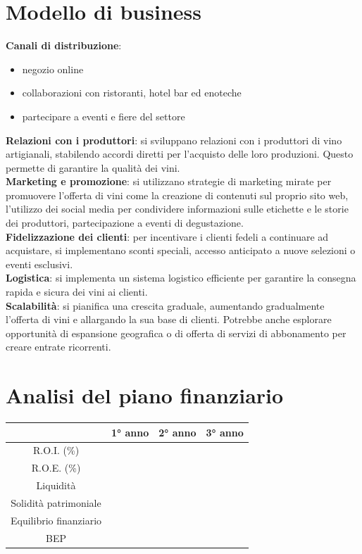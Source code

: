 \documentclass[12pt, a4paper]{article}
\newcommand{\meskip}{\medskip \\}
\begin{document}
\section*{Modello di business}
\textbf{Canali di distribuzione}:
\begin{itemize}[itemsep=-5pt, topsep=0pt]
    \item negozio online
    \item collaborazioni con ristoranti, hotel bar ed enoteche
    \item partecipare a eventi e fiere del settore
\end{itemize}\medskip
\textbf{Relazioni con i produttori}: si sviluppano relazioni con i produttori di vino artigianali, stabilendo accordi diretti per l'acquisto delle loro produzioni. Questo permette di garantire la qualità dei vini.\meskip
\textbf{Marketing e promozione}: si utilizzano strategie di marketing mirate per promuovere l'offerta di vini come la creazione di contenuti sul proprio sito web, l'utilizzo dei social media per condividere informazioni sulle etichette e le storie dei produttori, partecipazione a eventi di degustazione.\meskip
\textbf{Fidelizzazione dei clienti}: per incentivare i clienti fedeli a continuare ad acquistare, si implementano sconti speciali, accesso anticipato a nuove selezioni o eventi esclusivi.\meskip
\textbf{Logistica}: si implementa un sistema logistico efficiente per garantire la consegna rapida e sicura dei vini ai clienti.\meskip
\textbf{Scalabilità}: si pianifica una crescita graduale, aumentando gradualmente l'offerta di vini e allargando la sua base di clienti. Potrebbe anche esplorare opportunità di espansione geografica o di offerta di servizi di abbonamento per creare entrate ricorrenti.
\newpage
\section*{Analisi del piano finanziario}
\begin{tabular}{|c|c|c|c|}
    \hline
                           & 1° anno & 2° anno & 3° anno \\ \hline
    R.O.I. (\%)            &         &         &         \\ \hline
    R.O.E. (\%)            &         &         &         \\ \hline
    Liquidità              &         &         &         \\ \hline
    Solidità patrimoniale  &         &         &         \\ \hline
    Equilibrio finanziario &         &         &         \\ \hline
    BEP                    &         &         &         \\ \hline
\end{tabular}\bigskip
\end{document}
